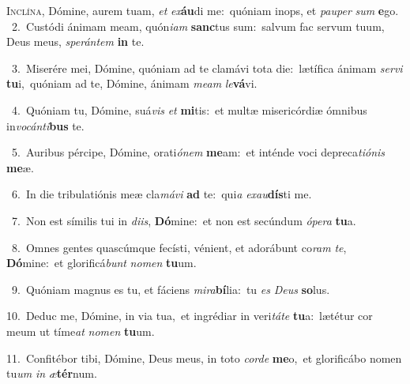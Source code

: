 \lettrine{\initial\textcolor{\initialcolor}{I}}{nclína,} Dómine, aurem tuam, \textit{et} \textit{ex}\-\textbf{áu}di me:~\star quóniam inops, et \textit{pau}\-\textit{per} \textit{sum} \textbf{e}\-go.\\
{\numbfont\textcolor{\numbcolor}{~2.}}~Custódi ánimam meam, quón\-\textit{i}\-\textit{am} \textbf{sanc}\-tus sum:~\star salvum fac servum tuum, Deus meus, \textit{spe}\-\textit{rán}\textit{tem} \textbf{in} te.\par
{\numbfont\textcolor{\numbcolor}{~3.}}~Miserére mei, Dómine, quóniam ad te clamávi tota die:~\dagger lætífica ánimam \textit{ser}\-\textit{vi} \textbf{tu}\-i,~\star quóniam ad te, Dómine, ánimam \textit{me}\-\textit{am} \textit{le}\-\textbf{vá}vi.\par
{\numbfont\textcolor{\numbcolor}{~4.}}~Quóniam tu, Dómine, suá\textit{vis} \textit{et} \textbf{mi}\-tis:~\star et multæ misericórdiæ ómnibus in\-\textit{vo}\-\textit{cán}\textit{ti}\textbf{bus} te.\par
{\numbfont\textcolor{\numbcolor}{~5.}}~Auribus pércipe, Dómine, orati\-\textit{ó}\-\textit{nem} \textbf{me}\-am:~\star et inténde voci depreca\-\textit{ti}\-\textit{ó}\textit{nis} \textbf{me}\-æ.\par
{\numbfont\textcolor{\numbcolor}{~6.}}~In die tribulatiónis meæ cla\-\textit{má}\-\textit{vi} \textbf{ad} te:~\star qui\textit{a} \textit{ex}\-\textit{au}\textbf{dís}ti me.\par
{\numbfont\textcolor{\numbcolor}{~7.}}~Non est símilis tui in \textit{di}\-\textit{is}, \textbf{Dó}\-mine:~\star et non est secúndum \textit{ó}\-\textit{pe}\textit{ra} \textbf{tu}\-a.\par
{\numbfont\textcolor{\numbcolor}{~8.}}~Omnes gentes quascúmque fecísti, vénient, et adorábunt co\textit{ram} \textit{te}\-, \textbf{Dó}\-mine:~\star et glorificá\textit{bunt} \textit{no}\-\textit{men} \textbf{tu}\-um.\par
{\numbfont\textcolor{\numbcolor}{~9.}}~Quóniam magnus es tu, et fáciens \textit{mi}\-\textit{ra}\textbf{bí}lia:~\star tu \textit{es} \textit{De}\-\textit{us} \textbf{so}\-lus.\par
{\numbfont\textcolor{\numbcolor}{10.}}~Deduc me, Dómine, in via tua,~\dagger et ingrédiar in veri\-\textit{tá}\-\textit{te} \textbf{tu}\-a:~\star lætétur cor meum ut tíme\textit{at} \textit{no}\-\textit{men} \textbf{tu}\-um.\par
{\numbfont\textcolor{\numbcolor}{11.}}~Confitébor tibi, Dómine, Deus meus, in toto \textit{cor}\-\textit{de} \textbf{me}\-o,~\star et glorificábo nomen tu\textit{um} \textit{in} \textit{æ}\-\textbf{tér}num.\par
